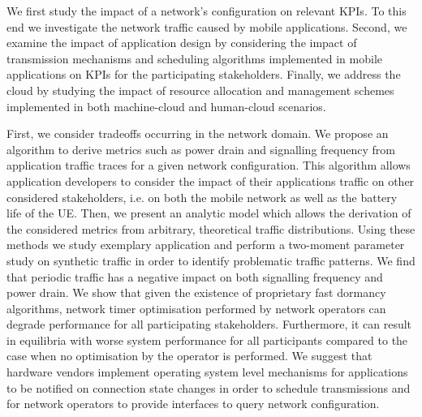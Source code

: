 We first study the impact of a network's configuration on relevant \glspl{KPI}.
To this end we investigate the network traffic caused by mobile applications.
Second, we examine the impact of application design by considering the impact of transmission mechanisms and scheduling algorithms implemented in mobile applications on \glspl{KPI} for the participating stakeholders.
Finally, we address the cloud by studying the impact of resource allocation and management schemes implemented in both machine-cloud and human-cloud scenarios.

First, we consider tradeoffs occurring in the network domain.
We propose an algorithm to derive metrics such as power drain and signalling frequency from application traffic traces for a given network configuration.
This algorithm allows application developers to consider the impact of their applications  traffic on other considered stakeholders, i.e. on both the mobile network as well as the battery life of the \gls{UE}.
Then, we present an analytic model which allows the derivation of the considered metrics from arbitrary, theoretical traffic distributions.
Using these methods we study exemplary application and perform a two-moment parameter study on synthetic traffic in order to identify problematic traffic patterns.
We find that periodic traffic has a negative impact on both signalling frequency and power drain.
We show that given the existence of proprietary fast dormancy algorithms, network timer optimisation performed by network operators can degrade performance for all participating stakeholders. 
Furthermore, it can result in equilibria with worse system performance for all participants compared to the case when no optimisation by the operator is performed.  
We suggest that hardware vendors implement operating system level mechanisms for applications to be notified on connection state changes in order to schedule transmissions and for network operators to provide interfaces to query network configuration.

